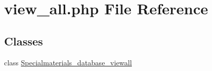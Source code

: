 \hypertarget{view__all_8php}{\section{view\+\_\+all.\+php File Reference}
\label{view__all_8php}
}
\subsection*{Classes}
\begin{DoxyCompactItemize}
\item 
class \hyperlink{classSpecialmaterials__database__viewall}{Specialmaterials\+\_\+database\+\_\+viewall}
\end{DoxyCompactItemize}
